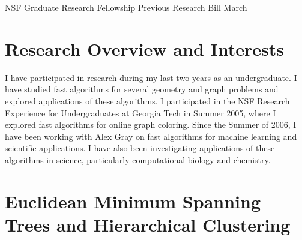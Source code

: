\documentclass[twoside,leqno, 12pt]{article}
\date{}
\begin{document}
\begin{center}
\LARGE{NSF Graduate Research Fellowship Previous Research} \newline
\Large{Bill March}
\end{center}




\section{Research Overview and Interests}

I have participated in research during my last two years as an undergraduate.  I have studied fast algorithms for several geometry and graph problems and explored applications of these algorithms.  I participated in the NSF Research Experience for Undergraduates at Georgia Tech in Summer 2005, where I explored fast algorithms for online graph coloring.  Since the Summer of 2006, I have been working with Alex Gray on fast algorithms for machine learning and scientific applications.  I have also been investigating applications of these algorithms in science, particularly computational biology and chemistry.  

\section{Euclidean Minimum Spanning Trees and Hierarchical Clustering}
\end{document}
